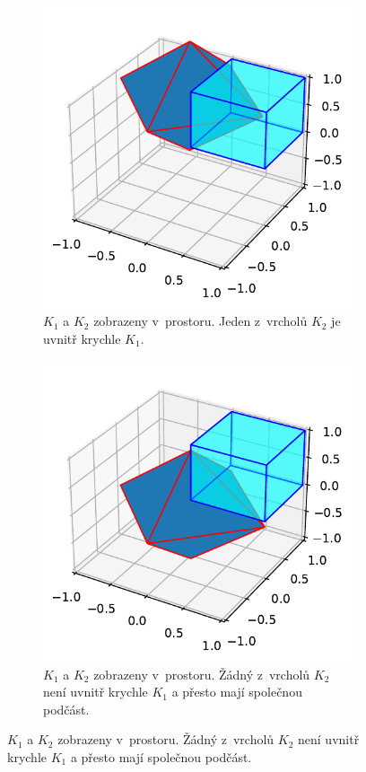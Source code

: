 \begin{figure}
     \begin{subfigure}[t]{0.45\textwidth}
    
    \centering
    \includegraphics[scale=0.7]{obrazky-figures/gjk/gjk-good.pdf}
    \caption{$K_1$ a $K_2$ zobrazeny v~prostoru. Jeden z~vrcholů $K_2$ je uvnitř krychle $K_1$.
    }
\end{subfigure}
    \hfill
     \begin{subfigure}[t]{0.45\textwidth}
    
    \centering
    \includegraphics[scale=0.7]{obrazky-figures/gjk/gjk-notgood.pdf}
    \caption{$K_1$ a $K_2$ zobrazeny v~prostoru. Žádný z~vrcholů $K_2$ není uvnitř krychle $K_1$ a přesto mají společnou podčást.}
\end{subfigure}


\end{figure}

